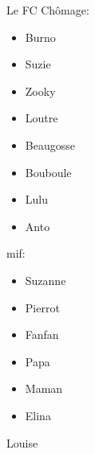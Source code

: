 Le FC Chômage:

\begin{itemize}
\item Burno
\item Suzie
\item Zooky
\item Loutre
\item Beaugosse
\item Bouboule
\item Lulu
\item Anto
\end{itemize}

mif:

\begin{itemize}
\item Suzanne
\item Pierrot
\item Fanfan
\item Papa
\item Maman
\item Elina
\end{itemize}



Louise
\endgroup